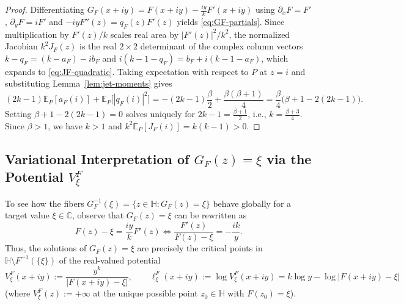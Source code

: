 \documentclass[12pt]{article}
\def\C{\mathbb{C}}
\def\H{\mathbb{H}}
\def\E{\mathbb{E}}
\theoremstyle{definition}
\numberwithin{equation}{section}
\begin{document}
\begin{proof}
Differentiating $G_F(x+iy) = F(x+iy) - \frac{iy}{k}F'(x+iy)$ using $\partial_x F = F'$, $\partial_y F = iF'$ and $-iy F''(z) = q_F(z) F'(z)$ yields \eqref{eq:GF-partials}. Since multiplication by $F'(z)/k$ scales real area by $|F'(z)|^2 / k^2$, the normalized Jacobian $k^2 J_F(z)$ is the real $2\times 2$ determinant of the complex column vectors $k - q_F = (k - a_F) - i b_F$ and $i(k - 1 - q_F) = b_F + i(k - 1 - a_F)$, which expands to \eqref{eq:JF-quadratic}. Taking expectation with respect to $P$ at $z = i$ and substituting Lemma~\ref{lem:jet-moments} gives
\[
  (2k - 1)\E_P[a_F(i)] + \E_P\Big[|q_F(i)|^2\Big] = -(2k - 1)\frac{\beta}{2} + \frac{\beta(\beta + 1)}{4} = \frac{\beta}{4}\Big(\beta + 1 - 2(2k - 1)\Big).
\]
Setting $\beta + 1 - 2(2k - 1) = 0$ solves uniquely for $2k - 1 = \frac{\beta+1}{2}$, i.e., $k = \frac{\beta+3}{4}$. Since $\beta > 1$, we have $k > 1$ and $k^2 \E_P[J_F(i)] = k(k - 1) > 0$.
\end{proof}

\subsection{Variational Interpretation of $G_F(z) = \xi$ via the Potential $V_\xi^F$}

To see how the fibers $G_F^{-1}(\xi) = \{z \in \H : G_F(z) = \xi\}$ behave globally for a target value $\xi \in \C$, observe that $G_F(z) = \xi$ can be rewritten as
\[
  F(z) - \xi = \frac{iy}{k} F'(z) \iff \frac{F'(z)}{F(z) - \xi} = -\frac{ik}{y}.
\]
Thus, the solutions of $G_F(z) = \xi$ are precisely the critical points in $\H \setminus F^{-1}(\{\xi\})$ of the real-valued potential
\begin{equation}\label{eq:V-target-def}
  V_\xi^F(x + iy) := \frac{y^k}{|F(x + iy) - \xi|}, \qquad \ell_\xi^F(x + iy) := \log V_\xi^F(x + iy) = k \log y - \log |F(x + iy) - \xi|
\end{equation}
(where $V_\xi^F(z) := +\infty$ at the unique possible point $z_0 \in \H$ with $F(z_0) = \xi$).
\end{document}
